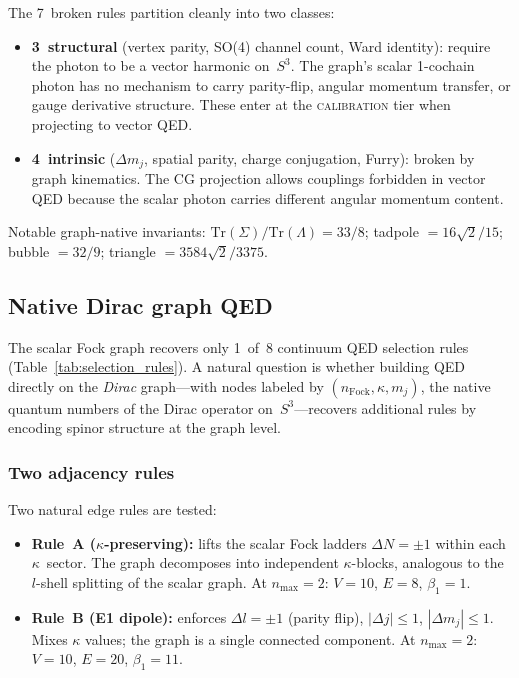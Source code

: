 \documentclass[11pt]{article}
\begin{document}
The 7~broken rules partition cleanly into two classes:
\begin{itemize}
\item \textbf{3~structural} (vertex parity, SO(4) channel count, Ward
  identity): require the photon to be a vector harmonic on~$S^3$.  The
  graph's scalar 1-cochain photon has no mechanism to carry parity-flip,
  angular momentum transfer, or gauge derivative structure.  These enter
  at the \textsc{calibration} tier when projecting to vector QED.
\item \textbf{4~intrinsic} ($\Delta m_j$, spatial parity, charge
  conjugation, Furry): broken by graph kinematics.  The CG projection
  allows couplings forbidden in vector QED because the scalar photon
  carries different angular momentum content.
\end{itemize}

Notable graph-native invariants: $\mathrm{Tr}(\Sigma)/\mathrm{Tr}(\Lambda) = 33/8$;
tadpole $= 16\sqrt{2}/15$; bubble $= 32/9$;
triangle $= 3584\sqrt{2}/3375$.

\subsection{Native Dirac graph QED}
\label{sec:dirac_graph_qed}

The scalar Fock graph recovers only 1~of~8 continuum QED selection
rules (Table~\ref{tab:selection_rules}).  A natural question is whether
building QED directly on the \emph{Dirac} graph---with nodes labeled by
$(n_{\mathrm{Fock}}, \kappa, m_j)$, the native quantum numbers of the
Dirac operator on~$S^3$---recovers additional rules by encoding spinor
structure at the graph level.

\subsubsection{Two adjacency rules}

Two natural edge rules are tested:
\begin{itemize}
\item \textbf{Rule~A ($\kappa$-preserving):} lifts the scalar Fock
  ladders $\Delta N = \pm 1$ within each $\kappa$~sector.  The graph
  decomposes into independent $\kappa$-blocks, analogous to the
  $l$-shell splitting of the scalar graph.  At $n_{\max} = 2$:
  $V = 10$, $E = 8$, $\beta_1 = 1$.
\item \textbf{Rule~B (E1 dipole):} enforces $\Delta l = \pm 1$
  (parity flip), $|\Delta j| \le 1$, $|\Delta m_j| \le 1$.  Mixes
  $\kappa$ values; the graph is a single connected component.  At
  $n_{\max} = 2$: $V = 10$, $E = 20$, $\beta_1 = 11$.
\end{itemize}
\end{document}
